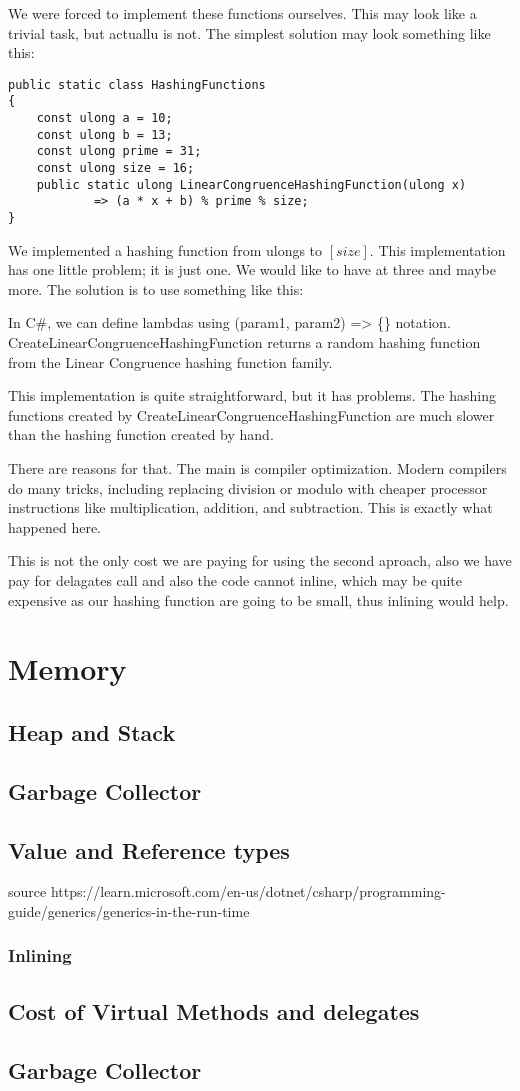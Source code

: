 We were forced to implement these functions ourselves. This may look like a trivial task, but actuallu is not. The simplest solution may look something like this:
\begin{lstlisting}
public static class HashingFunctions
{
	const ulong a = 10;
	const ulong b = 13;
	const ulong prime = 31;
	const ulong size = 16;
	public static ulong LinearCongruenceHashingFunction(ulong x) 
            => (a * x + b) % prime % size;
}
\end{lstlisting}
We implemented a hashing function from ulongs to $[size]$. This implementation has one little problem; it is just one. We would like to have at three and maybe more. The solution is to use something like this:




In C\#, we can define lambdas using (param1, param2) => \{\}  notation. 
CreateLinearCongruenceHashingFunction returns a random hashing function from the Linear Congruence hashing function family. 

This implementation is quite straightforward, but it has problems. The hashing functions created by CreateLinearCongruenceHashingFunction are much slower than the hashing function created by hand. 

There are reasons for that. The main is compiler optimization. Modern compilers do many tricks, including replacing division or modulo with cheaper processor instructions like multiplication, addition, and subtraction. This is exactly what happened here.

This is not the only cost we are paying for using the second aproach, also we have pay for delagates call and also the code cannot inline, which may be quite expensive as our hashing function are going to be small, thus inlining would help.

\section{Memory}
\subsection{Heap and Stack}
\subsection{Garbage Collector}
\subsection{Value and Reference types}



source
https://learn.microsoft.com/en-us/dotnet/csharp/programming-guide/generics/generics-in-the-run-time



\subsubsection{Inlining}



\subsection{Cost of Virtual Methods and delegates}

\subsection{Garbage Collector}
